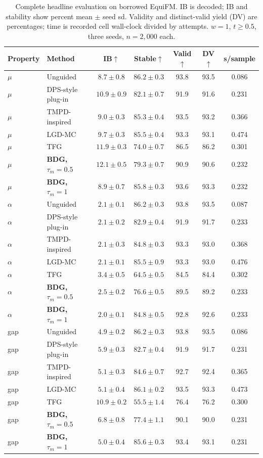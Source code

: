 \documentclass{article}
\begin{document}
\begin{table}[!htbp]
\centering\small
\caption{Complete headline evaluation on borrowed EquiFM. IB is decoded; IB and stability show percent mean $\pm$ seed sd. Validity and distinct-valid yield (DV) are percentages; time is recorded cell wall-clock divided by attempts. $w=1$, $t\ge0.5$, three seeds, $n=2{,}000$ each.}
\label{tab:full-equifm}
\begin{tabular}{llccccc}
\toprule
Property & Method & IB$\uparrow$ & Stable$\uparrow$ & Valid$\uparrow$ & DV$\uparrow$ & s/sample\\
\midrule
$\mu$ & Unguided & $8.7\pm0.8$ & $86.2\pm0.3$ & 93.8 & 93.5 & 0.086\\
$\mu$ & DPS-style plug-in & $10.9\pm0.9$ & $82.1\pm0.7$ & 91.9 & 91.6 & 0.231\\
$\mu$ & TMPD-inspired & $9.0\pm0.3$ & $85.3\pm0.4$ & 93.5 & 93.2 & 0.366\\
$\mu$ & LGD-MC & $9.7\pm0.3$ & $85.5\pm0.4$ & 93.3 & 93.1 & 0.474\\
$\mu$ & TFG & $11.9\pm0.3$ & $74.0\pm0.7$ & 86.5 & 86.2 & 0.301\\
$\mu$ & \textbf{BDG, $\tau_m=0.5$} & $12.1\pm0.5$ & $79.3\pm0.7$ & 90.9 & 90.6 & 0.232\\
$\mu$ & \textbf{BDG, $\tau_m=1$} & $8.9\pm0.7$ & $85.8\pm0.3$ & 93.6 & 93.3 & 0.232\\
\midrule
$\alpha$ & Unguided & $2.1\pm0.1$ & $86.2\pm0.3$ & 93.8 & 93.5 & 0.087\\
$\alpha$ & DPS-style plug-in & $2.1\pm0.2$ & $82.9\pm0.4$ & 91.9 & 91.7 & 0.233\\
$\alpha$ & TMPD-inspired & $2.1\pm0.3$ & $84.8\pm0.3$ & 93.3 & 93.0 & 0.368\\
$\alpha$ & LGD-MC & $2.1\pm0.1$ & $85.5\pm0.9$ & 93.3 & 93.0 & 0.476\\
$\alpha$ & TFG & $3.4\pm0.5$ & $64.5\pm0.5$ & 84.5 & 84.4 & 0.302\\
$\alpha$ & \textbf{BDG, $\tau_m=0.5$} & $2.5\pm0.2$ & $76.6\pm0.5$ & 89.5 & 89.2 & 0.233\\
$\alpha$ & \textbf{BDG, $\tau_m=1$} & $2.0\pm0.1$ & $84.8\pm0.5$ & 92.8 & 92.6 & 0.233\\
\midrule
gap & Unguided & $4.9\pm0.2$ & $86.2\pm0.3$ & 93.8 & 93.5 & 0.086\\
gap & DPS-style plug-in & $5.9\pm0.3$ & $82.7\pm0.4$ & 91.9 & 91.7 & 0.231\\
gap & TMPD-inspired & $5.1\pm0.3$ & $84.6\pm0.7$ & 92.7 & 92.4 & 0.365\\
gap & LGD-MC & $5.1\pm0.4$ & $86.1\pm0.2$ & 93.5 & 93.3 & 0.473\\
gap & TFG & $10.9\pm0.2$ & $55.5\pm1.4$ & 76.4 & 76.2 & 0.300\\
gap & \textbf{BDG, $\tau_m=0.5$} & $6.8\pm0.8$ & $77.4\pm1.1$ & 90.1 & 90.0 & 0.231\\
gap & \textbf{BDG, $\tau_m=1$} & $5.0\pm0.4$ & $85.6\pm0.3$ & 93.4 & 93.1 & 0.231\\
\bottomrule
\end{tabular}
\end{table}
\end{document}
